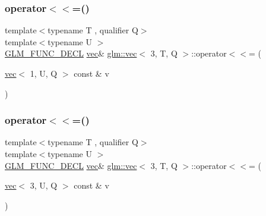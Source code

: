 \subsubsection{\texorpdfstring{operator$<$$<$=()}{operator<<=()}\hspace{0.1cm}{\footnotesize\ttfamily [2/6]}}
{\footnotesize\ttfamily template$<$typename T , qualifier Q$>$ \\
template$<$typename U $>$ \\
\mbox{\hyperlink{setup_8hpp_ab2d052de21a70539923e9bcbf6e83a51}{G\+L\+M\+\_\+\+F\+U\+N\+C\+\_\+\+D\+E\+CL}} \mbox{\hyperlink{structglm_1_1vec}{vec}}\& \mbox{\hyperlink{structglm_1_1vec}{glm\+::vec}}$<$ 3, T, Q $>$\+::operator$<$$<$= (\begin{DoxyParamCaption}\item[{\mbox{\hyperlink{structglm_1_1vec}{vec}}$<$ 1, U, Q $>$ const \&}]{v }\end{DoxyParamCaption})}

\mbox{\label{structglm_1_1vec_3_013_00_01_t_00_01_q_01_4_aad0c7ea72dfec6224b1a5cabeea950fb}} 
\subsubsection{\texorpdfstring{operator$<$$<$=()}{operator<<=()}\hspace{0.1cm}{\footnotesize\ttfamily [3/6]}}
{\footnotesize\ttfamily template$<$typename T , qualifier Q$>$ \\
template$<$typename U $>$ \\
\mbox{\hyperlink{setup_8hpp_ab2d052de21a70539923e9bcbf6e83a51}{G\+L\+M\+\_\+\+F\+U\+N\+C\+\_\+\+D\+E\+CL}} \mbox{\hyperlink{structglm_1_1vec}{vec}}\& \mbox{\hyperlink{structglm_1_1vec}{glm\+::vec}}$<$ 3, T, Q $>$\+::operator$<$$<$= (\begin{DoxyParamCaption}\item[{\mbox{\hyperlink{structglm_1_1vec}{vec}}$<$ 3, U, Q $>$ const \&}]{v }\end{DoxyParamCaption})}

\mbox{\label{structglm_1_1vec_3_013_00_01_t_00_01_q_01_4_a473a7e56a46f30b068af234b3babd712}} 
